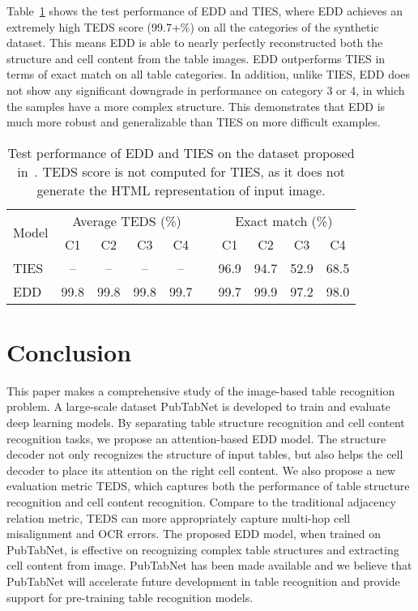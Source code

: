 \documentclass[conference]{IEEEtran}
\begin{document}
Table~\ref{tab:test_TIES} shows the test performance of EDD and TIES, where EDD
achieves an extremely high TEDS score (99.7+\%) on all the categories of the
synthetic dataset. This means EDD is able to nearly perfectly reconstructed both
the structure and cell content from the table images. EDD outperforms TIES in
terms of exact match on all table categories. In addition, unlike TIES, EDD does
not show any significant downgrade in performance on category 3 or 4, in which
the samples have a more complex structure. This demonstrates that EDD is much
more robust and generalizable than TIES on more difficult examples.

\begin{table}[!htb]
  \begin{center}
    \begin{tabularx}{.85\linewidth}{lccccccccc}
      \toprule
      \multirow{2}{*}{Model} & \multicolumn{4}{c}{Average TEDS (\%)} & & \multicolumn{4}{c}{Exact match (\%)} \\
        \cline{2-5}\cline{7-10}
         & C1 & C2 & C3 & C4 & & C1 & C2 & C3 & C4 \\
      \midrule
      TIES & \--- & \--- & \--- & \--- & & 96.9 & 94.7 & 52.9 & 68.5 \\
      EDD & 99.8 & 99.8 & 99.8 & 99.7 & & 99.7 & 99.9 & 97.2 & 98.0 \\
\bottomrule
    \end{tabularx}
  \end{center}
\caption{Test performance of EDD and TIES on the dataset proposed in~\cite{qasim2019rethinking}. TEDS score is not computed for TIES, as it does not generate the HTML representation of input image.}
\label{tab:test_TIES}
\end{table}

\section{Conclusion}

This paper makes a comprehensive study of the image-based table recognition
problem. A large-scale dataset PubTabNet is developed to train and evaluate deep
learning models. By separating table structure recognition and cell content
recognition tasks, we propose an attention-based EDD model. The structure
decoder not only recognizes the structure of input tables, but also helps the
cell decoder to place its attention on the right cell content. We also propose a
new evaluation metric TEDS, which captures both the performance of table
structure recognition and cell content recognition. Compare to the traditional
adjacency relation metric, TEDS can more appropriately capture multi-hop cell
misalignment and OCR errors. The proposed EDD model, when trained on PubTabNet,
is effective on recognizing complex table structures and extracting cell content
from image. PubTabNet has been made available and we believe that PubTabNet will
accelerate future development in table recognition and provide support for
pre-training table recognition models.
\end{document}
